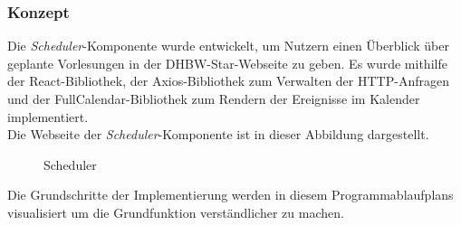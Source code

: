 \subsubsection{Konzept}
Die \emph{Scheduler}-Komponente wurde entwickelt, um Nutzern einen Überblick über geplante Vorlesungen in der DHBW-Star-Webseite zu geben. Es wurde mithilfe der React-Bibliothek, der Axios-Bibliothek zum Verwalten der HTTP-Anfragen und der FullCalendar-Bibliothek zum Rendern der Ereignisse im Kalender implementiert.\\
Die Webseite der \emph{Scheduler}-Komponente ist in dieser Abbildung dargestellt.\\
\begin{figure}[htbp]
	\centering
	\caption{Scheduler}
\end{figure}
\newpage
Die Grundschritte der Implementierung werden in diesem Programmablaufplans visualisiert um die Grundfunktion verständlicher zu machen.
